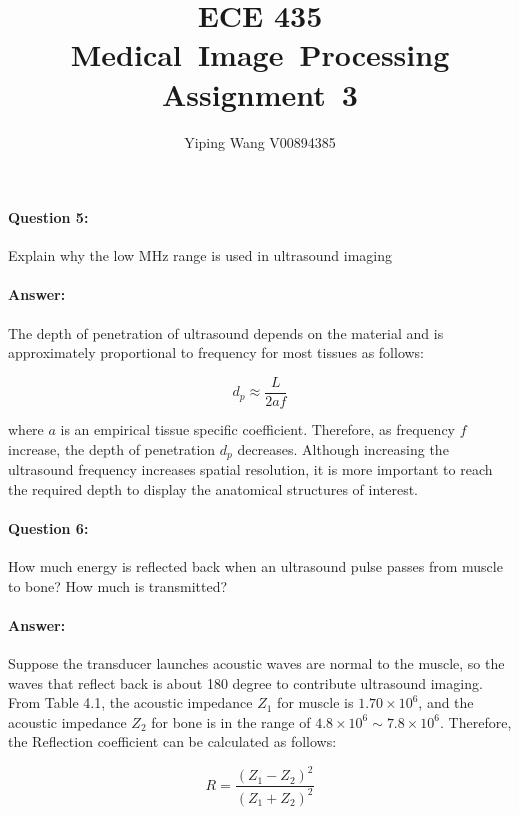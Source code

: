 \documentclass[12pt, letter]{article}
\newcommand{\courseName}{ECE 435 Medical~Image~Processing}
\newcommand{\assignName}{Assignment~3}
\begin{document}
\pagestyle{titlesec_assignment}

\title{\courseName\\\assignName}
\author{Yiping Wang V00894385}
\maketitle

\paragraph{Question 5: } Explain why the low MHz range is used in ultrasound imaging

\paragraph{Answer: } The depth of penetration of ultrasound depends on the material and is approximately proportional to frequency for most tissues as follows:

\begin{equation}
    d_p \approx \frac{L}{2af}
\end{equation}

where $a$ is an empirical tissue specific coefficient. Therefore, as frequency $f$ increase, the depth of penetration $d_p$ decreases. Although increasing the ultrasound frequency increases spatial resolution, it is more important to reach the required depth to display the anatomical structures of interest.

\paragraph{Question 6:} How much energy is reflected back when an ultrasound pulse passes from muscle to bone? How much is transmitted?

\paragraph{Answer: }
Suppose the transducer launches acoustic waves are normal to the muscle, so the waves that reflect back is about 180 degree to contribute ultrasound imaging. From Table 4.1, the acoustic impedance $Z_1$ for muscle is $1.70 \times 10^6$, and the acoustic impedance $Z_2$ for bone is in the range of $4.8 \times 10^6 \sim 7.8 \times 10^6$. Therefore, the Reflection coefficient can be calculated as follows:

\begin{equation}
R = \frac{(Z_1 - Z_2)^2}{(Z_1 + Z_2)^2}
\end{equation}
\end{document}

